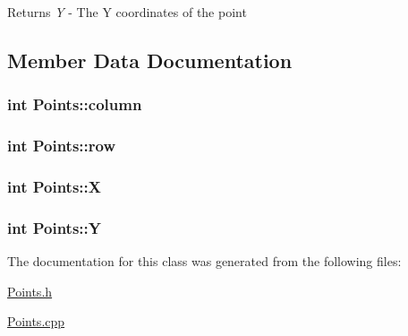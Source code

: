 \begin{DoxyReturn}{Returns}
{\itshape Y\/} -\/ The Y coordinates of the point 
\end{DoxyReturn}


\subsection{Member Data Documentation}
\hypertarget{classPoints_a8e0c88423dde84bd39edea1e5d59d5c9}{
\subsubsection[{column}]{\setlength{\rightskip}{0pt plus 5cm}int {\bf Points::column}}}
\label{classPoints_a8e0c88423dde84bd39edea1e5d59d5c9}
\hypertarget{classPoints_a623ad517502bf64f0e7a19d68387fe99}{
\subsubsection[{row}]{\setlength{\rightskip}{0pt plus 5cm}int {\bf Points::row}}}
\label{classPoints_a623ad517502bf64f0e7a19d68387fe99}
\hypertarget{classPoints_a7d7b56ddf7b70ee5294682a906cbe2f6}{
\subsubsection[{X}]{\setlength{\rightskip}{0pt plus 5cm}int {\bf Points::X}}}
\label{classPoints_a7d7b56ddf7b70ee5294682a906cbe2f6}
\hypertarget{classPoints_acdf2dd50360f247d9862b23afbad3d56}{
\subsubsection[{Y}]{\setlength{\rightskip}{0pt plus 5cm}int {\bf Points::Y}}}
\label{classPoints_acdf2dd50360f247d9862b23afbad3d56}


The documentation for this class was generated from the following files:\begin{DoxyCompactItemize}
\item 
\hyperlink{Points_8h}{Points.h}\item 
\hyperlink{Points_8cpp}{Points.cpp}\end{DoxyCompactItemize}
